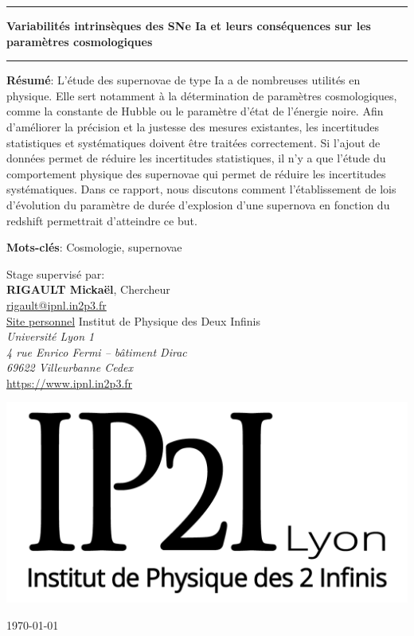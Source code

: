 \documentclass[a4paper, 12pt, svgnames]{article}
\begin{document}
\begin{center}\vfill\hrule\vspace*{8pt}

\textbf{\huge Variabilités intrinsèques des SNe Ia et leurs conséquences sur les
paramètres cosmologiques}\\

\hrule\vfill

\parbox{15cm}{\small\textbf{Résumé}:
L'étude des supernovae de type Ia a de nombreuses utilités en physique. Elle
sert notamment à la détermination de paramètres cosmologiques, comme la
constante de Hubble ou le paramètre d'état de l'énergie noire. Afin d'améliorer
la précision et la justesse des mesures existantes, les incertitudes
statistiques et systématiques doivent être traitées correctement. Si l'ajout de
données permet de réduire les incertitudes statistiques, il n'y a que l'étude du
comportement physique des supernovae qui permet de réduire les incertitudes
systématiques. Dans ce rapport, nous discutons comment l'établissement de lois
d'évolution du paramètre de durée d'explosion d'une supernova en fonction du
redshift permettrait d'atteindre ce but.}\vspace{0.5cm}

\parbox{15cm}{\small\textbf{Mots-clés}:
Cosmologie, supernovae}\vspace{0.5cm}

\parbox{15cm}{Stage supervisé par:\\
\textbf{\textsc{RIGAULT} Mickaël}, Chercheur\\
\href{mailto:rigault@ipnl.in2p3.fr}{rigault@ipnl.in2p3.fr}\\
\href{https://www.ipnl.in2p3.fr/perso/rigault/}{Site personnel}\bigbreak
Institut de Physique des Deux Infinis\\
{\textit{Université Lyon 1\\4 rue Enrico Fermi -- bâtiment Dirac\\
69622 Villeurbanne Cedex}}\\
\url{https://www.ipnl.in2p3.fr}}\vspace{.5cm}\vfill

\includegraphics[width=.3\textwidth]{General_figures/IP2I.png}
\end{center}\vfill \hfill \today
\newpage
\thispagestyle{empty}
\setcounter{page}{0}
\end{document}
